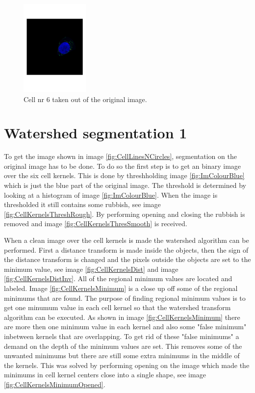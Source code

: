 \documentclass[10pt,twocolumn]{article}
\begin{document}
\begin{figure}[ht]
\centering
\includegraphics[width=0.3\textwidth]{Bilder/CellPart.pdf}
\caption{Cell nr 6 taken out of the original image.}
\label{fig:CellPart}
\end{figure}

%
%

\section{Watershed segmentation 1} \label{sec:WatSeg1}
To get the image shown in image \ref{fig:CellLinesNCircles}, segmentation
on the original image has to be done. To do so the first step is to get an binary image over the
six cell kernels. This is done by threshholding image \ref{fig:ImColourBlue} which is
just the blue part of the original image. The threshold is determined by looking at
a histogram of image \ref{fig:ImColourBlue}. When the image is thresholded it still
contains some rubbish, see image \ref{fig:CellKernelsThreshRough}. By performing
opening and closing the rubbish is removed and image \ref{fig:CellKernelsThresSmooth} is received.

When a clean image over the cell kernels is made the watershed algorithm can be performed.
First a distance transform is made inside the objects, then the sign
of the distance transform is changed and the pixels outside the objects are set
to the minimum value, see image \ref{fig:CellKernelsDist} and image \ref{fig:CellKernelsDistInv}. All of the regional minimum values
are located and labeled. Image \ref{fig:CellKernelsMinimum} is a close up off some of the regional minimums that are found.
The purpose of finding regional minimum values is to get one minumum value in each cell kernel so that
the watershed transform algorithm can be executed. As shown in image \ref{fig:CellKernelsMinimum} there are
more then one minimum value in each kernel and also some "false minimum" inbetween kernels that are overlapping.
To get rid of these "false minimums" a demand on the depth of the minimum values are set. This removes some of the unwanted
minimums but there are still some extra minimums in the middle of the kernels. This
was solved by performing opening on the image which made the minimums in cell kernel centers close into a single shape,
see image \ref{fig:CellKernelsMinimumOpened}.
\end{document}
